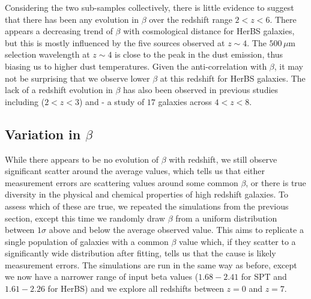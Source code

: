 Considering the two sub-samples collectively, there is little evidence to suggest that there has been any evolution in $\beta$ over the redshift range $2 < z < 6$. There appears a decreasing trend of $\beta$ with cosmological distance for HerBS galaxies, but this is mostly influenced by the five sources observed at $z \sim 4$. The $500\,\mu$m selection wavelength at $z \sim 4$ is close to the peak in the dust emission, thus biasing us to higher dust temperatures. Given the anti-correlation with $\beta$, it may not be surprising that we observe lower $\beta$ at this redshift for HerBS galaxies. The lack of a redshift evolution in $\beta$ has also been observed in previous studies including \citealt{Ismail_2023} ($2 < z < 3$) and \citealt{Witstok_2023} - a study of $17$ galaxies across $4 < z < 8$.

\subsection{Variation in $\beta$}

While there appears to be no evolution of $\beta$ with redshift, we still observe significant scatter around the average values, which tells us that either measurement errors are scattering values around some common $\beta$, or there is true diversity in the physical and chemical properties of high redshift galaxies. To assess which of these are true, we repeated the simulations from the previous section, except this time we randomly draw $\beta$ from a uniform distribution between $1\sigma$ above and below the average observed value. This aims to replicate a single population of galaxies with a common $\beta$ value which, if they scatter to a significantly wide distribution after fitting, tells us that the cause is likely measurement errors. The simulations are run in the same way as before, except we now have a narrower range of input beta values ($1.68 - 2.41$ for SPT and $1.61 - 2.26$ for HerBS) and we explore all redshifts between $z = 0$ and $z = 7$.


